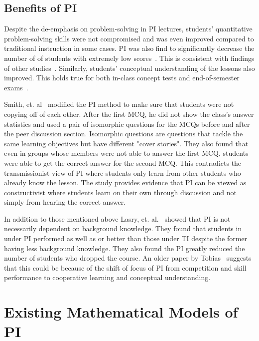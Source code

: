 \documentclass[twocolumn,secnumarabic,amssymb, nobibnotes, aps, prd]{revtex4-2}
\begin{document}
    \subsection{Benefits of PI}

    Despite the de-emphasis on problem-solving in PI lectures, students' quantitative problem-solving skills were not compromised and was even improved compared to traditional instruction in some cases.
    PI was also find to significantly decrease the number of of students with extremely low scores~\cite{crouch2001peer}.
    This is consistent with findings of other studies~\cite{lasry2008peer,thacker1994comparing}.
    Similarly, students' conceptual understanding of the lessons also improved.
    This holds true for both in-class concept tests and end-of-semester exams~\cite{crouch2001peer}.

    Smith, et. al~\cite{smith2009peer} modified the PI method to make sure that students were not copying off of each other. After the first MCQ, he did not show the class's answer statistics and used a pair of isomorphic questions for the MCQs before and after the peer discussion section. Isomorphic questions are questions that tackle the same learning objectives but have different "cover stories".
    They also found that even in groups whose members were not able to answer the first MCQ, students were able to get the correct answer for the second MCQ.
    This contradicts the transmissionist view of PI where students only learn from other students who already know the lesson.
    The study provides evidence that PI can be viewed as constructivist where students learn on their own through discussion and not simply from hearing the correct answer.

    In addition to those mentioned above Lasry, et. al.~\cite{lasry2008peer} showed that PI is not necessarily dependent on background knowledge. They found that students in under PI performed as well as or better than those under TI despite the former having less background knowledge.
    They also found the PI greatly reduced the number of students who dropped the course.
    An older paper by Tobias~\cite{tobias1990they} suggests that this could be because of the shift of focus of PI from competition and skill performance to cooperative learning and conceptual understanding.


\section{Existing Mathematical Models of PI}
\end{document}
